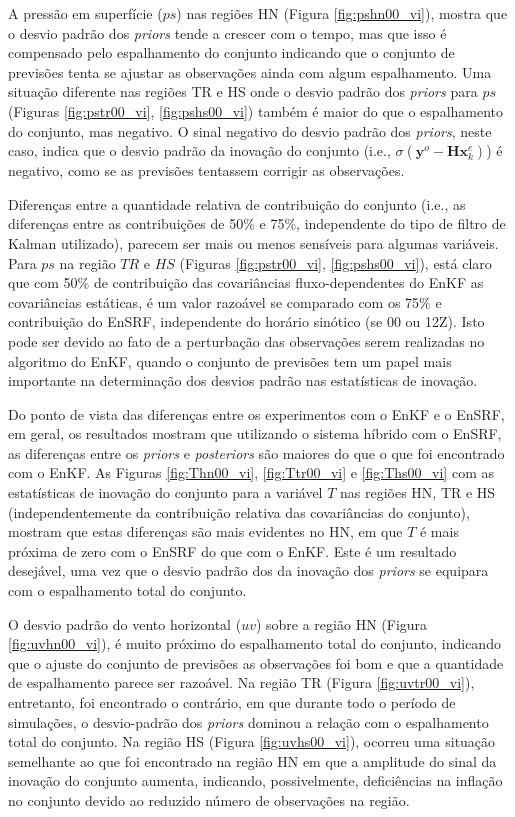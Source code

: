 A pressão em superfície ($ps$) nas regiões HN (Figura \ref{fig:pshn00_vi}), mostra que o desvio padrão dos \textit{priors} tende a crescer com o tempo, mas que isso é compensado pelo espalhamento do conjunto indicando que o conjunto de previsões tenta se ajustar as observações ainda com algum espalhamento. Uma situação diferente nas regiões TR e HS onde o desvio padrão dos \textit{priors} para $ps$ (Figuras \ref{fig:pstr00_vi}, \ref{fig:pshs00_vi}) também é maior do que o espalhamento do conjunto, mas negativo. O sinal negativo do desvio padrão dos \textit{priors}, neste caso, indica que o desvio padrão da inovação do conjunto (i.e., $\sigma{(\mathbf{y}^{o}-\mathbf{H}\mathbf{x}_{k}^{e})}$) é negativo, como se as previsões tentassem corrigir as observações.

Diferenças entre a quantidade relativa de contribuição do conjunto (i.e., as diferenças entre as contribuições de 50\% e 75\%, independente do tipo de filtro de Kalman utilizado), parecem ser mais ou menos sensíveis para algumas variáveis. Para $ps$ na região $TR$ e $HS$ (Figuras \ref{fig:pstr00_vi}, \ref{fig:pshs00_vi}), está claro que com 50\% de contribuição das covariâncias fluxo-dependentes do EnKF as covariâncias estáticas, é um valor razoável se comparado com os 75\% e contribuição do EnSRF, independente do horário sinótico (se 00 ou 12Z). Isto pode ser devido ao fato de a perturbação das observações serem realizadas no algoritmo do EnKF, quando o conjunto de previsões tem um papel mais importante na determinação dos desvios padrão nas estatísticas de inovação.

Do ponto de vista das diferenças entre os experimentos com o EnKF e o EnSRF, em geral, os resultados mostram que utilizando o sistema híbrido com o EnSRF, as diferenças entre os \textit{priors} e \textit{posteriors} são maiores do que o que foi encontrado com o EnKF. As Figuras \ref{fig:Thn00_vi}, \ref{fig:Ttr00_vi} e \ref{fig:Ths00_vi} com as estatísticas de inovação do conjunto para a variável $T$ nas regiões HN, TR e HS (independentemente da contribuição relativa das covariâncias do conjunto), mostram que estas diferenças são mais evidentes no HN, em que $T$ é mais próxima de zero com o EnSRF do que com o EnKF. Este é um resultado desejável, uma vez que o desvio padrão dos da inovação dos \textit{priors} se equipara com o espalhamento total do conjunto.

O desvio padrão do vento horizontal ($uv$) sobre a região HN (Figura \ref{fig:uvhn00_vi}), é muito próximo do espalhamento total do conjunto, indicando que o ajuste do conjunto de previsões as observações foi bom e que a quantidade de espalhamento parece ser razoável. Na região TR (Figura \ref{fig:uvtr00_vi}), entretanto, foi encontrado o contrário, em que durante todo o período de simulações, o desvio-padrão dos \textit{priors} dominou a relação com o espalhamento total do conjunto. Na região HS (Figura \ref{fig:uvhs00_vi}), ocorreu uma situação semelhante ao que foi encontrado na região HN em que a amplitude do sinal da inovação do conjunto aumenta, indicando, possivelmente, deficiências na inflação no conjunto devido ao reduzido número de observações na região.

